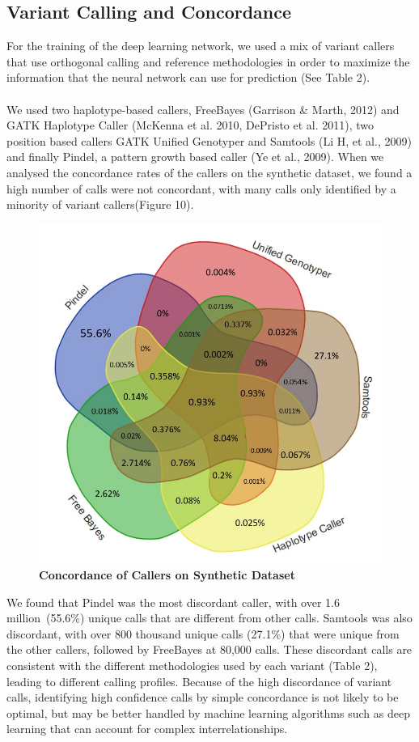 \documentclass{article}
\begin{document}
\subsection{Variant Calling and Concordance}
For the training of the deep learning network, we used a mix of variant callers that use orthogonal calling and reference methodologies in order to maximize the information that the neural network can use for prediction (See Table 2).\\\\
We used two haplotype-based callers, FreeBayes (Garrison \& Marth, 2012) and GATK Haplotype Caller (McKenna et al. 2010, DePristo et al. 2011), two position based callers GATK Unified Genotyper and Samtools (Li H, et al., 2009) and finally Pindel, a pattern growth based caller (Ye et al., 2009). When we analysed the concordance rates of the callers on the synthetic dataset, we found a high number of calls were not concordant, with many calls only identified by a minority of variant callers(Figure 10).
\begin{figure}[H]
\includegraphics[width=\textwidth]{venndiagram.jpg}
\centering
\caption{\textbf{Concordance of Callers on Synthetic Dataset}}
\end{figure} 
We found that Pindel was the most discordant caller, with over 1.6 million\ (55.6\%) unique calls that are different from other calls. Samtools was also discordant, with over 800 thousand unique calls (27.1\%) that were unique from the other callers, followed by FreeBayes at 80,000 calls. These discordant calls are consistent with the different methodologies used by each variant (Table 2), leading to different calling profiles. Because of the high discordance of variant calls, identifying high confidence calls by simple concordance is not likely to be optimal, but may be better handled by machine learning algorithms such as deep learning that can account for complex interrelationships.\\
\end{document}
